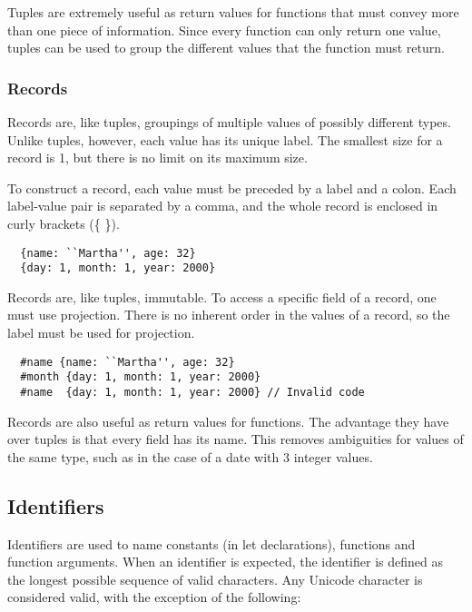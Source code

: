 \documentclass{article}
\begin{document}
Tuples are extremely useful as return values for functions that must convey more than one piece of information.
Since every function can only return one value, tuples can be used to group the different values that the function must return.

\subsubsection{Records}

Records are, like tuples, groupings of multiple values of possibly different types.
Unlike tuples, however, each value has its unique label.
The smallest size for a record is 1, but there is no limit on its maximum size.

To construct a record, each value must be preceded by a label and a colon.
Each label-value pair is separated by a comma, and the whole record is enclosed in curly brackets (\{ \}).

\begin{lstlisting}
  {name: ``Martha'', age: 32}
  {day: 1, month: 1, year: 2000}
\end{lstlisting}

Records are, like tuples, immutable.
To access a specific field of a record, one must use projection.
There is no inherent order in the values of a record, so the label must be used for projection.

\begin{lstlisting}
  #name {name: ``Martha'', age: 32}
  #month {day: 1, month: 1, year: 2000}
  #name  {day: 1, month: 1, year: 2000} // Invalid code
\end{lstlisting}

Records are also useful as return values for functions.
The advantage they have over tuples is that every field has its name.
This removes ambiguities for values of the same type, such as in the case of a date with 3 integer values.

\subsection{Identifiers}

Identifiers are used to name constants (in let declarations), functions and function arguments.
When an identifier is expected, the identifier is defined as the longest possible sequence of valid characters.
Any Unicode character is considered valid, with the exception of the following:

\medskip
\end{document}
